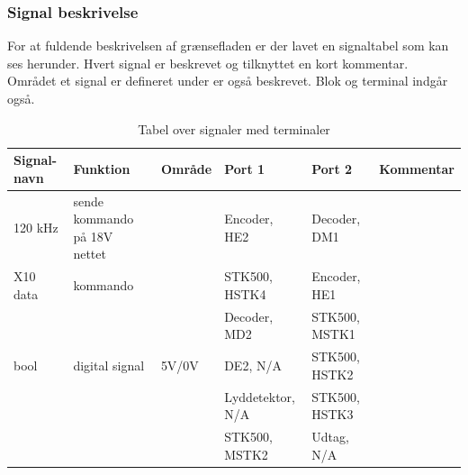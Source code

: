 \begin{table}[htbp]
\subsubsection{Signal beskrivelse}
For at fuldende beskrivelsen af grænsefladen er der lavet en signaltabel som kan ses herunder. Hvert signal er beskrevet og tilknyttet en kort kommentar. Området et signal er defineret under er også beskrevet. Blok og terminal indgår også. 
\caption{Tabel over signaler med terminaler}
\begin{small}
\begin{tabular}{|p{2cm}|p{2cm}|p{2cm}|p{2cm}|p{2cm}|p{}|}
\hline
\textbf{Signal-navn} & \textbf{Funktion} & \textbf{Område} & \textbf{Port 1} & \textbf{Port 2} & \textbf{Kommentar} \\ \hline

120 kHz & sende kommando på 18V nettet & & Encoder, HE2 & Decoder, DM1 & \\ \hline

X10 data & kommando & & STK500, HSTK4 & Encoder, HE1 & \\ \cline{4-5}
&&& Decoder, MD2 & STK500, MSTK1 &\\ \hline

bool & digital signal & 5V/0V & DE2, N/A & STK500, HSTK2 & \\ \cline{4-5}
&&& Lyddetektor, N/A & STK500, HSTK3 & \\ \cline{4-5}
&&& STK500, MSTK2 & Udtag, N/A & \\ \hline
\end{tabular}
\end{small}
\label{table:Signaltabel}
\end{table}


